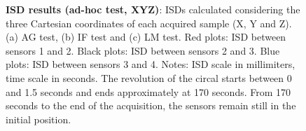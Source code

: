\begin{figure}
	\caption[ISD results (ad-hoc test, XYZ)]{\textbf{ISD results (ad-hoc test, XYZ)}:
	ISDs calculated considering the three Cartesian coordinates of each 
	acquired sample (X, Y and Z).
	(a) AG test, (b) IF test and (c) LM test.
	Red plots: ISD between sensors 1 and 2. Black plots: ISD between sensors 2
	and 3. Blue plots: ISD between sensors 3 and 4. 
	Notes: ISD scale in millimiters, time scale in seconds. The revolution of
	the circal starts between 0 and 1.5 seconds and ends approximately at 170
	seconds. From 170 seconds to the end of the acquisition, the sensors remain
	still in the initial position.
	}
	\label{fig:linguometer:technical:interference:isd}
\end{figure}
